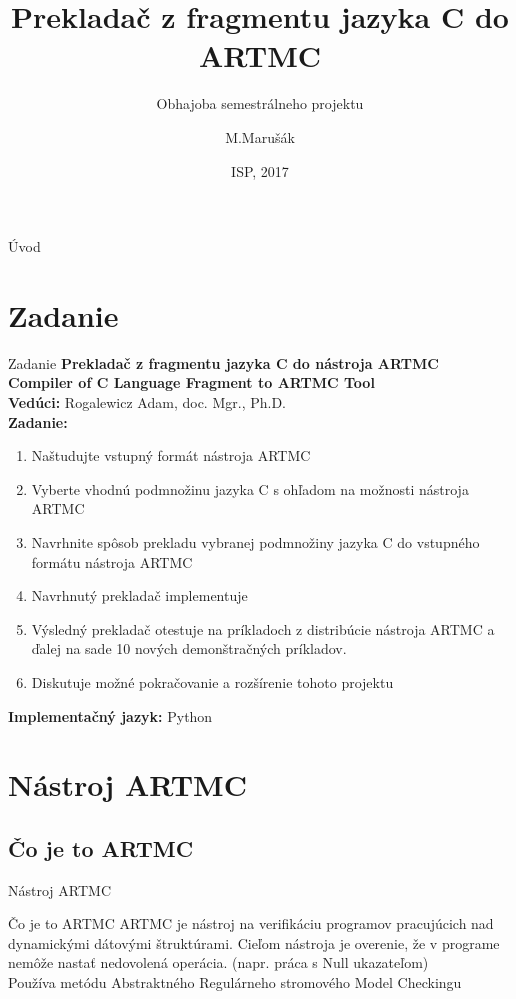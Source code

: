\documentclass[slovak]{beamer}
\title{Prekladač z fragmentu jazyka C do ARTMC}
\subtitle{Obhajoba semestrálneho projektu}
\author{M.Marušák}
\institute[Vysoké učení technické] %
{
  Ústav inteligentých systémov\\
  Vysoké učení technické v Brne

}
\date{ISP, 2017}
\begin{document}
\begin{frame}
  \titlepage
\end{frame}

\begin{frame}{Úvod}
  \tableofcontents
\end{frame}

\section{Zadanie}


\begin{frame}{Zadanie}
    \large\textbf{Prekladač z fragmentu jazyka C do nástroja ARTMC}\\
    \small\textbf{Compiler of C Language Fragment to ARTMC Tool}\\
    \normalsize\textbf{Vedúci:} Rogalewicz Adam, doc. Mgr., Ph.D.\\
    \normalsize\textbf{Zadanie:}
    \begin{enumerate}
        \item Naštudujte vstupný formát nástroja ARTMC
        \item Vyberte vhodnú podmnožinu jazyka C s ohľadom na možnosti nástroja ARTMC
        \item Navrhnite spôsob prekladu vybranej podmnožiny jazyka C do vstupného formátu nástroja ARTMC
        \noindent\makebox[\linewidth]{\rule{\paperwidth}{0.4pt}}
        \item Navrhnutý prekladač implementuje
        \item Výsledný prekladač otestuje na príkladoch z distribúcie nástroja ARTMC a ďalej na sade 10 nových demonštračných príkladov.
        \item Diskutuje možné pokračovanie a rozšírenie tohoto projektu
    \end{enumerate}
    \normalsize\textbf{Implementačný jazyk:} Python\\
\end{frame}

\section{Nástroj ARTMC}

\subsection{Čo je to ARTMC}
\begin{frame}{Nástroj ARTMC}
\begin{block}{Čo je to ARTMC}
ARTMC je nástroj na verifikáciu programov pracujúcich nad dynamickými dátovými štruktúrami. Cieľom nástroja je overenie, že v programe nemôže nastať nedovolená operácia. (napr. práca s Null ukazateľom)\\
Používa metódu Abstraktného Regulárneho stromového Model Checkingu
\end{block}
\end{frame}
\end{document}
